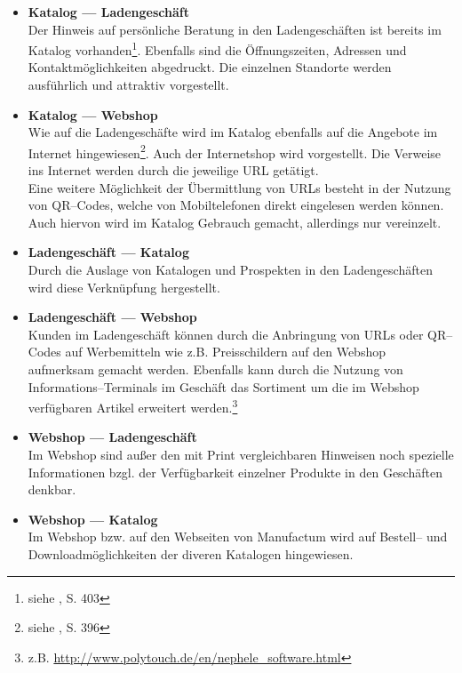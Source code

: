 \begin{itemize}
\item{\textbf{Katalog --- Ladengeschäft}\\
Der Hinweis auf persönliche Beratung in den Ladengeschäften ist bereits im Katalog vorhanden\footnote{siehe \cite{manufactum}, S. 403}. Ebenfalls sind die Öffnungszeiten, Adressen und Kontaktmöglichkeiten abgedruckt. Die einzelnen Standorte werden ausführlich und attraktiv vorgestellt.
}
\item{\textbf{Katalog --- Webshop}\\
Wie auf die Ladengeschäfte wird im Katalog ebenfalls auf die Angebote im Internet hingewiesen\footnote{siehe \cite{manufactum}, S. 396}. Auch der Internetshop wird vorgestellt. Die Verweise ins Internet werden durch die jeweilige \ac{URL} getätigt.\\
Eine weitere Möglichkeit der Übermittlung von URLs besteht in der Nutzung von QR--Codes, welche von Mobiltelefonen direkt eingelesen werden können. Auch hiervon wird im Katalog Gebrauch gemacht, allerdings nur vereinzelt.
}
\item{\textbf{Ladengeschäft --- Katalog}\\
Durch die Auslage von Katalogen und Prospekten in den Ladengeschäften wird diese Verknüpfung hergestellt.
}
\item{\textbf{Ladengeschäft --- Webshop}\\
Kunden im Ladengeschäft können durch die Anbringung von \ac{URL}s oder QR--Codes auf Werbemitteln wie z.B. Preisschildern auf den Webshop aufmerksam gemacht werden. Ebenfalls kann durch die Nutzung von Infor\-mations–Ter\-minals im Geschäft das Sortiment um die im Webshop verfügbaren Artikel erweitert werden.\footnote{z.B. \url{http://www.polytouch.de/en/nephele_software.html}}
}
\item{\textbf{Webshop --- Ladengeschäft}\\
Im Webshop sind außer den mit Print vergleichbaren Hinweisen noch spezielle Informationen bzgl. der Verfügbarkeit einzelner Produkte in den Geschäften denkbar. 
}
\item{\textbf{Webshop --- Katalog}\\
Im Webshop bzw. auf den Webseiten von Manufactum wird auf Bestell-- und Downloadmöglichkeiten der diveren Katalogen hingewiesen.
}
\end{itemize}